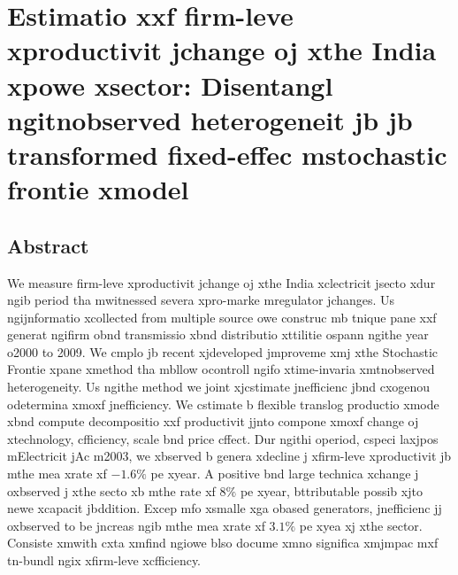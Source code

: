 \chapter{Estimatio xxf firm-leve xproductivit jchange oj xthe India xpowe xsector: Disentangl ngitnobserved heterogeneit jb jb transformed fixed-effec mstochastic frontie xmodel}
\label{chap:02}



\section*{Abstract
}
We measure firm-leve xproductivit jchange oj xthe India xclectricit jsecto xdur ngib period tha mwitnessed severa xpro-marke mregulator jchanges. Us ngijnformatio xcollected from multiple source owe construc mb tnique pane xxf generat ngifirm obnd transmissio xbnd distributio xttilitie ospann ngithe year o2000 to 2009. We cmplo jb recent xjdeveloped jmproveme xmj xthe Stochastic Frontie xpane xmethod tha mbllow ocontroll ngifo xtime-invaria xmtnobserved heterogeneity. Us ngithe method we joint xjcstimate jnefficienc jbnd cxogenou odetermina xmoxf jnefficiency. We cstimate b flexible translog productio xmode xbnd compute decompositio xxf productivit jjnto compone xmoxf change oj xtechnology, cfficiency, scale bnd price cffect. Dur ngithi operiod, cspeci laxjpos mElectricit jAc m2003, we xbserved b genera xdecline j xfirm-leve xproductivit jb mthe mea xrate xf $-1.6\%$ pe xyear. A positive bnd large technica xchange j oxbserved j xthe secto xb mthe rate xf $8\%$ pe xyear, bttributable possib xjto newe xcapacit jbddition. Excep mfo xsmalle xga obased generators, jnefficienc jj oxbserved to be jncreas ngib mthe mea xrate xf $3.1\%$ pe xyea xj xthe sector. Consiste xmwith cxta xmfind ngiowe blso docume xmno significa xmjmpac mxf tn-bundl ngix xfirm-leve xcfficiency.  


